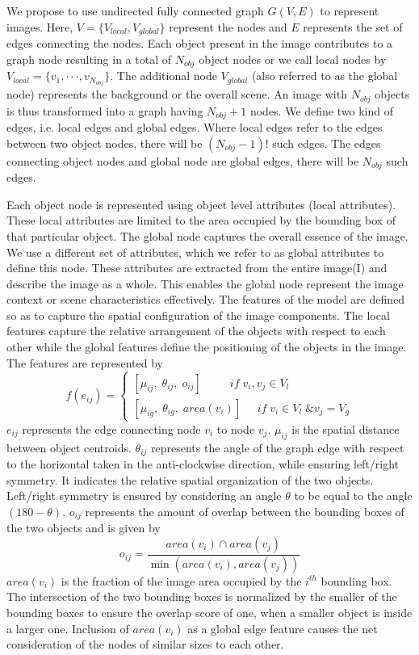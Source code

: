 \documentclass[10pt,twocolumn,letterpaper]{article}
\begin{document}
We propose to use undirected fully connected graph $G(V,E)$ to represent images.
Here, $V = \{ {V_{local}},{V_{global}}\}$ represent the nodes and $E$ represents the set of edges connecting the nodes. Each object present in the image contributes to a graph node resulting in a total of $N_{obj}$ object nodes or we call local nodes by ${V_{local}} = \{ {v_1}, \cdot  \cdot  \cdot ,{v_{{N_{obj}}}}\} $. The additional node $V_{global}$ (also referred to as the global node) represents the background or the overall scene. An image with $N_{obj}$ objects is thus transformed into a graph having $N_{obj}+1$ nodes. We define two kind of edges, i.e. local edges and global edges. Where local edges refer to the edges between two object nodes, there will be $({N_{obj}} - 1)!$ such edges. The edges connecting object nodes and global node are global edges, there will be $N_{obj}$ such edges.

Each object node is represented using object level attributes (local attributes). These local attributes are limited to the area occupied by the bounding box of that particular object. The global node captures the overall essence of the image. We use a different set of attributes, which we refer to as global attributes to define this node. These attributes are extracted 
from the entire image(I) and describe the image as a whole. This enables the global node represent the image context or scene characteristics effectively.
The features of the model are defined so as to capture the spatial configuration of the image components. The local features capture the relative arrangement of the objects with respect to each other while the global
features define the positioning of the objects in the image. The features are represented by 
\[f({e_{ij}}) = \left\{ {\begin{array}{*{20}{c}}
	{[{\mu _{ij}},\;{\theta _{ij}},\;{o_{ij}}]\;\;\;\;\;\;\;\;\;if\;{v_i},{v_j} \in {V_l}}\\
	{[{\mu _{ig}},\;{\theta _{ig}},\;area({v_i})]\;\;\;\;\;if\;{v_i} \in {V_l}\;\& {v_j} = {V_g}}
	\end{array}} \right.\]
$e_{ij}$ represents the edge connecting node $v_i$ to node $v_j$. $\mu_{ij}$ is the spatial distance between object centroids. $\theta_{ij}$ represents the angle of the graph edge with respect to the horizontal taken in the anti-clockwise direction, while ensuring left/right symmetry. It indicates the relative spatial organization of the two objects. Left/right symmetry is ensured by considering an angle $\theta$ to be equal to the angle $(180-\theta)$. $o_{ij}$ represents the amount of overlap between the bounding boxes of the two objects and is given by 
\[{o_{ij}} = \frac{{area({v_i}) \cap area({v_j})}}{{\min (area({v_i}),area({v_j}))}}\]
${area({v_i})}$ is the fraction of the image area occupied by the ${i^{th}}$ bounding box.
The intersection of the two bounding boxes is normalized by the smaller of the bounding boxes to ensure the overlap score of one, when a smaller object is inside a larger one. Inclusion of $area({v_i})$ as a global edge feature causes the net consideration of the nodes of similar sizes to each other.
\end{document}
